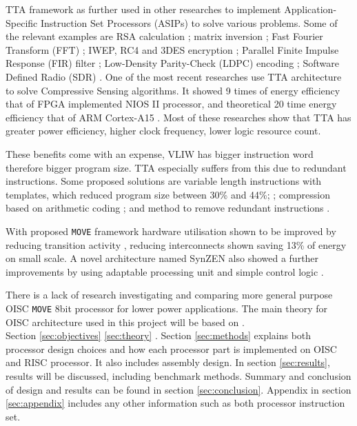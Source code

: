 TTA framework as further used in other researches to implement Application-Specific Instruction Set Processors (ASIPs) to solve various problems. Some of the relevant examples are RSA calculation \autocite{6128530}; matrix inversion \autocite{1540373}; Fast Fourier Transform (FFT) \autocite{8682289}; IWEP, RC4 and 3DES encryption \autocite{922340}; Parallel Finite Impulse Response (FIR) filter \autocite{1511285}; Low-Density Parity-Check (LDPC) encoding \autocite{6855236}; Software Defined Radio (SDR) \autocite{7363689}. One of the most recent researches use TTA architecture to solve Compressive Sensing algorithms. It showed 9 times of energy efficiency that of FPGA implemented NIOS II processor, and theoretical 20 time energy efficiency that of ARM Cortex-A15 \autocite{8573494}. Most of these researches show that TTA has greater power efficiency, higher clock frequency, lower logic resource count. 

These benefits come with an expense, VLIW has bigger instruction word therefore bigger program size. TTA especially suffers from this due to redundant instructions. Some proposed solutions are variable length instructions with templates, which reduced program size between 30\% and 44\%; \autocite{1213033,6893206}; compression based on arithmetic coding \autocite{4627144}; and method to remove redundant instructions \autocite{5403730}. 

With proposed \texttt{MOVE} framework hardware utilisation shown to be improved by reducing transition activity \autocite{1207041}, reducing interconnects shown saving 13\% of energy \autocite{6972455} on small scale. A novel architecture named SynZEN also showed a further improvements by using adaptable processing unit and simple control logic \autocite{6403142}.

There is a lack of research investigating and comparing more general purpose OISC \texttt{MOVE} 8bit processor for lower power applications.  The main theory for OISC architecture used in this project will be based on \autocite{ong_ang_seng_2010,gilreath_laplante_2003,kong_ang_seng_adejo_2010,dharshana_balasubramanian_arun_2016}.
\\[1cm]

Section \ref{sec:objectives} \ref{sec:theory} . Section \ref{sec:methods} explains both processor design choices and how each processor part is implemented on OISC and RISC processor. It also includes assembly design. In section \ref{sec:results}, results will be discussed, including benchmark methods. Summary and conclusion of design and results can be found in section \ref{sec:conclusion}. Appendix in section \ref{sec:appendix} includes any other information such as both processor instruction set.
